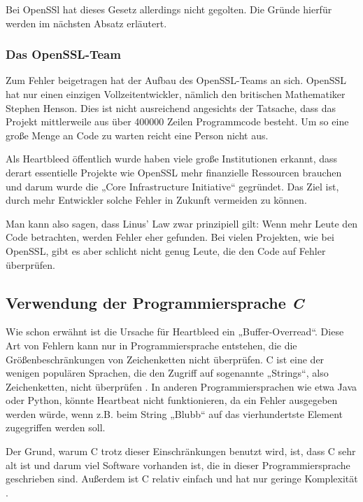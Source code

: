 \documentclass[12pt]{article}
\begin{document}
Bei OpenSSl hat dieses Gesetz allerdings nicht gegolten. Die Gründe hierfür werden im nächsten Absatz erläutert. 

\subsubsection{Das OpenSSL-Team}

Zum Fehler beigetragen hat der Aufbau des OpenSSL-Teams an sich. OpenSSL hat nur einen einzigen Vollzeitentwickler, nämlich den britischen Mathematiker Stephen Henson. Dies ist nicht ausreichend angesichts der Tatsache, dass das Projekt mittlerweile aus über 400000 Zeilen Programmcode besteht. Um so eine große Menge an Code zu warten reicht eine Person nicht aus. \citep{stokel-walker_internet_2014, vaughan-nichols_cash_2014}

Als Heartbleed öffentlich wurde haben viele große Institutionen erkannt, dass derart essentielle Projekte wie OpenSSL mehr finanzielle Ressourcen brauchen und darum wurde die „Core Infrastructure Initiative“ gegründet. Das Ziel ist, durch mehr Entwickler solche Fehler in Zukunft vermeiden zu können. 

Man kann also sagen, dass Linus' Law zwar prinzipiell gilt: Wenn mehr Leute den Code betrachten, werden Fehler eher gefunden. Bei vielen Projekten, wie bei OpenSSL, gibt es aber schlicht nicht genug Leute, die den Code auf Fehler überprüfen.

\subsection{Verwendung der Programmiersprache \textit{C}}

Wie schon erwähnt ist die Ursache für Heartbleed ein „Buffer-Overread“. Diese Art von Fehlern kann nur in Programmiersprache entstehen, die die Größenbeschränkungen von Zeichenketten nicht überprüfen. C ist eine der wenigen populären Sprachen, die den Zugriff auf sogenannte „Strings“, also Zeichenketten, nicht überprüfen \citep{wheeler_how_2014}. In anderen Programmiersprachen wie etwa Java oder Python, könnte Heartbeat nicht funktionieren, da ein Fehler ausgegeben werden würde, wenn z.B. beim String „Blubb“ auf das vierhundertste Element zugegriffen werden soll. 

Der Grund, warum C trotz dieser Einschränkungen benutzt wird, ist, dass C sehr alt ist und darum viel Software vorhanden ist, die in dieser Programmiersprache geschrieben sind. Außerdem ist C relativ einfach und hat nur geringe Komplexität \citep{cheng_ten_2011}.
\end{document}
